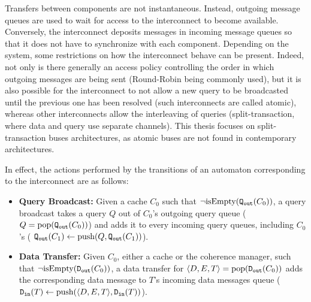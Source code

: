 Transfers between components are not instantaneous. Instead, outgoing message
queues are used to wait for access to the interconnect to become available.
Conversely, the interconnect deposits messages in incoming message queues so
that it does not have to synchronize with each component. Depending on the
system, some restrictions on how the interconnect behave can be present.
Indeed, not only is there generally an access policy controlling the order in
which outgoing messages are being sent (Round-Robin being commonly used), but
it is also possible for the interconnect to not allow a new query to be
broadcasted until the previous one has been resolved (such interconnects are
called atomic), whereas other interconnects allow the interleaving of queries
(split-transaction, where data and query use separate channels). This thesis
focuses on split-transaction buses architectures, as atomic buses are not found
in contemporary architectures.

In effect, the actions performed by the transitions of an automaton
corresponding to the interconnect are as follows:
\begin{itemize}
\item \textbf{Query Broadcast:}
   Given a cache $C_0$ such that $\neg\text{isEmpty}(\text{\texttt{Q\textsubscript{out}}}{}(C_0))$, a
   query broadcast takes a query $Q$ out of $C_0$'s outgoing query queue ($Q =
   \text{pop}(\text{\texttt{Q\textsubscript{out}}}{}(C_0))$) and adds it to every incoming query
   queues, including $C_0$'s (%
   $\text{\texttt{Q\textsubscript{out}}}{}(C_1) \gets \text{push}(Q,\text{\texttt{Q\textsubscript{out}}}{}(C_1))$).

\item \textbf{Data Transfer:}
   Given $C_0$, either a cache or the coherence manager, such that
   $\neg\text{isEmpty}(\text{\texttt{D\textsubscript{out}}}{}(C_0))$, a data transfer for
   $\langle{}D, E, T\rangle{} = \text{pop}(\text{\texttt{D\textsubscript{out}}}{}(C_0))$ adds the
   corresponding data message to $T$'s incoming data messages queue (%
   $\updatefun{%
      \cachedatainfun{}%
   }{T}{%
      \pushfun{\langle{}D, E, T\rangle{}}{%
         \cachedatainfun{}(T)
      }
   }$).
\end{itemize}
